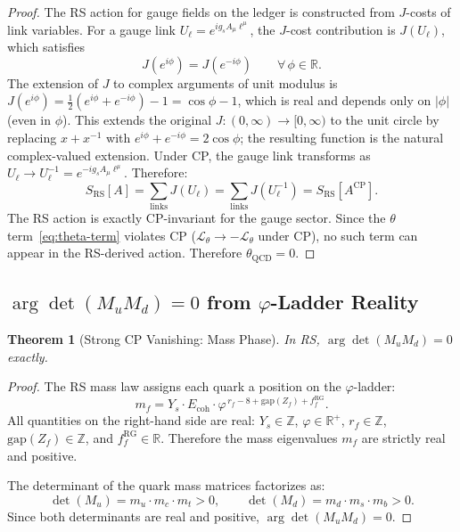 \documentclass[12pt,a4paper]{article}
\newtheorem{theorem}{Theorem}[section]
\theoremstyle{definition}
\theoremstyle{remark}
\begin{document}
\begin{proof}
The RS action for gauge fields on the ledger is constructed
from $J$-costs of link variables.  For a gauge link
$U_\ell = e^{i g_s A_\mu \ell^\mu}$, the $J$-cost contribution
is $J(U_\ell)$, which satisfies
\begin{equation}
  J(e^{i\phi}) = J(e^{-i\phi}) \qquad \forall\, \phi \in
  \mathbb{R}.
  \label{eq:j-phase-sym}
\end{equation}
The extension of $J$ to complex arguments of unit modulus is
$J(e^{i\phi}) = \frac{1}{2}(e^{i\phi} + e^{-i\phi}) - 1 = \cos\phi - 1$,
which is real and depends only on $|\phi|$ (even in $\phi$).
This extends the original $J: (0,\infty) \to [0,\infty)$ to
the unit circle by replacing $x + x^{-1}$ with $e^{i\phi} + e^{-i\phi}
= 2\cos\phi$; the resulting function is the natural complex-valued
extension.  Under CP, the gauge link transforms as
$U_\ell \to U_\ell^{-1} = e^{-ig_s A_\mu \ell^\mu}$.
Therefore:
\begin{equation}
  S_{\mathrm{RS}}[A] = \sum_{\mathrm{links}} J(U_\ell)
  = \sum_{\mathrm{links}} J(U_\ell^{-1})
  = S_{\mathrm{RS}}[A^{\mathrm{CP}}].
\end{equation}
The RS action is exactly CP-invariant for the gauge sector.
Since the $\theta$ term~\eqref{eq:theta-term} violates CP
($\mathcal{L}_\theta \to -\mathcal{L}_\theta$ under CP), no
such term can appear in the RS-derived action.  Therefore
$\theta_{\mathrm{QCD}} = 0$.
\end{proof}

\subsection{$\arg\!\det(M_u M_d) = 0$ from $\varphi$-Ladder
Reality}

\begin{theorem}[Strong CP Vanishing: Mass Phase]
\label{thm:theta-mass}
In RS, $\arg\!\det(M_u M_d) = 0$ exactly.
\end{theorem}

\begin{proof}
The RS mass law assigns each quark a position on the
$\varphi$-ladder:
\begin{equation}
  m_f = Y_s \cdot E_{\mathrm{coh}} \cdot
  \varphi^{\,r_f - 8 + \mathrm{gap}(Z_f) + f^{\mathrm{RG}}_f}.
\end{equation}
All quantities on the right-hand side are real:
$Y_s \in \mathbb{Z}$, $\varphi \in \mathbb{R}^+$,
$r_f \in \mathbb{Z}$, $\mathrm{gap}(Z_f) \in \mathbb{Z}$,
and $f^{\mathrm{RG}}_f \in \mathbb{R}$.  Therefore the
mass eigenvalues $m_f$ are strictly real and positive.

The determinant of the quark mass matrices factorizes as:
\begin{equation}
  \det(M_u) = m_u \cdot m_c \cdot m_t > 0, \qquad
  \det(M_d) = m_d \cdot m_s \cdot m_b > 0.
\end{equation}
Since both determinants are real and positive,
$\arg\!\det(M_u M_d) = 0$.
\end{proof}
\end{document}
